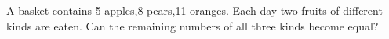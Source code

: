 A basket contains 5 apples,8 pears,11 oranges. Each day two fruits of different kinds are eaten. Can the remaining numbers of all three kinds become equal?
